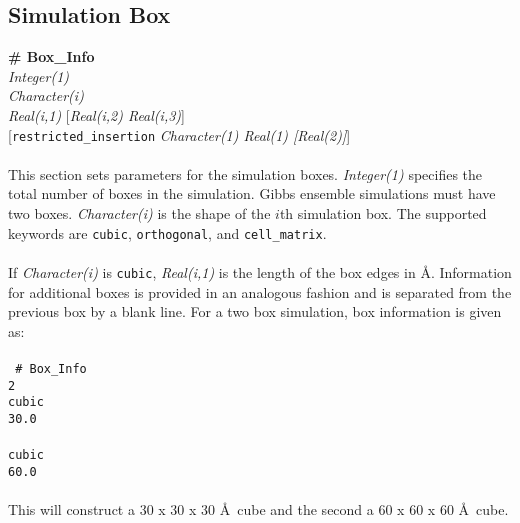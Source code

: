 \subsection{Simulation Box}\label{sec:Box_Info}
{\bf \# Box\_Info} \\
{\it Integer(1)} \\
{\it Character(i)}  \\
{\it Real(i,1)} [{\it Real(i,2) Real(i,3)}] \\
{[}{\tt restricted\_insertion} {\it Character(1) Real(1) [Real(2)]}] \\ \\
This section sets parameters for the simulation boxes.
{\it Integer(1)} specifies the total number of boxes in the simulation.
Gibbs ensemble simulations must have two boxes.
{\it Character(i)} is the shape of the $i$th simulation box.
The supported keywords are \texttt{cubic}, \texttt{orthogonal}, and \texttt{cell\_matrix}. \\ \\
%
If {\it Character(i)} is \texttt{cubic}, \emph{Real(i,1)} is the length of the box edges in \AA.
Information for additional boxes is provided in an analogous fashion
and is separated from the previous box by a blank line.
For a two box simulation, box information is given as: \\ \\
%
\texttt{
\# Box\_Info \\
 2 \\
 cubic \\
 30.0  \\
 \\
 cubic \\
 60.0} \\ \\
%
This will construct a 30 x 30 x 30 \AA\ cube and the second a 60 x 60 x 60 \AA\ cube.

